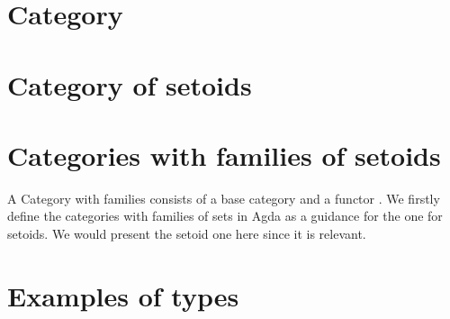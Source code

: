 \documentclass[11pt,a4paper,UKenglish,twoside,openright]{Thesis}
\begin{document}


\section{Category}



\section{Category of setoids}



\section{Categories with families of setoids}\label{cwf}


A Category with families consists of a base category and a functor
\cite{clairambault2005categories}. We firstly define the categories with
families of sets in Agda  as a guidance for the one for setoids. We
would present the setoid one here since it is relevant.



\section{Examples of types}











\backmatter


\label{Bibliography}




\end{document}
